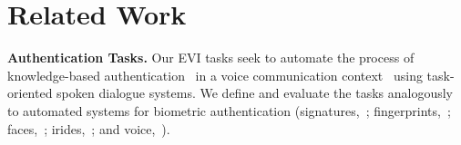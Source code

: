 \documentclass[11pt]{article}
\newcommand{\sparagraph}[1]{\noindent\textbf{#1.}}
\begin{document}
{\vspace{-0.5mm}

\begin{table}[t]
\def\arraystretch{0.87}
\begin{center}
\end{center}
\caption{Identification task with a \texttt{KB oracle}.}
\label{tab:results_kb_oracle}
\end{table}
  
\section{Related Work}

\vspace{-1mm}

\sparagraph{Authentication Tasks}
Our EVI tasks
seek to automate the process
of knowledge-based authentication~\cite{braz2006security,o2003comparing} in a voice communication context~\cite{o2006comparing,o2006speak,o2005query}
using task-oriented spoken dialogue systems.
We define and evaluate the tasks
analogously to 
automated systems for biometric authentication
(signatures,~\citealp{yeung2004svc2004};
fingerprints,~\citealp{maio2002fvc2000};
faces,~\citealp{phillips2003face};
irides,~\citealp{phillips2008iris};
and voice,~\citealp{doddington2000nist}).
\vspace{-0.5mm}

}
\end{document}
